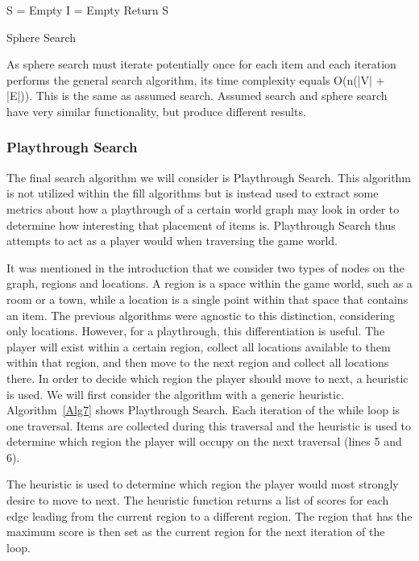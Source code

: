 \documentclass{ieeeaccess}
\begin{document}
\begin{algorithm}
\label{Alg6}
\SetAlgoLined
{}
    S = Empty\;
    I = Empty\;
    Return S\;
 \caption{Sphere Search}
\end{algorithm}

As sphere search must iterate potentially once for each item and each iteration performs the
general search algorithm, its time complexity equals O(n(|V| + |E|)). This is the same as
assumed search. Assumed search and sphere search have very similar functionality, but produce
different results.

\subsubsection{Playthrough Search}
The final search algorithm we will consider is Playthrough Search. This algorithm is not
utilized within the fill algorithms but is instead used to extract some metrics about how a
playthrough of a certain world graph may look in order to determine how interesting that
placement of items is. Playthrough Search thus attempts to act as a player would when
traversing the game world. 

It was mentioned in the introduction that we consider two types of nodes on the graph, regions
and locations. A region is a space within the game world, such as a room or a town, while a
location is a single point within that space that contains an item. The previous algorithms
were agnostic to this distinction, considering only locations. However, for a playthrough, this
differentiation is useful. The player will exist within a certain region, collect all locations
available to them within that region, and then move to the next region and collect all
locations there. In order to decide which region the player should move to next, a heuristic is
used. We will first consider the algorithm with a generic heuristic. Algorithm~\ref{Alg7} shows
Playthrough Search. Each iteration of the while loop is one traversal. Items are collected
during this traversal and the heuristic is used to determine which region the player
will occupy on the next traversal (lines 5 and 6).

The heuristic is used to determine which region the player would most strongly desire to move
to next. The heuristic function returns a list of scores for each edge leading from the current
region to a different region. The region that has the maximum score is then set as the current
region for the next iteration of the loop.
\end{document}
